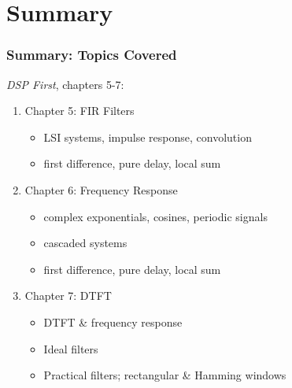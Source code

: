 \documentclass{beamer}
\begin{document}
\section[Summary]{Summary}
\setcounter{subsection}{1}

\begin{frame}
  \frametitle{Summary: Topics Covered}

  {\em DSP First}, chapters 5-7:
  \begin{enumerate}
  \item Chapter 5: FIR Filters
    \begin{itemize}
    \item LSI systems, impulse response, convolution
    \item first difference, pure delay, local sum
    \end{itemize}
  \item Chapter 6: Frequency Response
    \begin{itemize}
    \item complex exponentials, cosines, periodic signals
    \item cascaded systems
    \item first difference, pure delay, local sum
    \end{itemize}
  \item Chapter 7: DTFT
    \begin{itemize}
    \item DTFT \& frequency response
    \item Ideal filters
    \item Practical filters; rectangular \& Hamming windows
    \end{itemize}
  \end{enumerate}
\end{frame}
\end{document}

